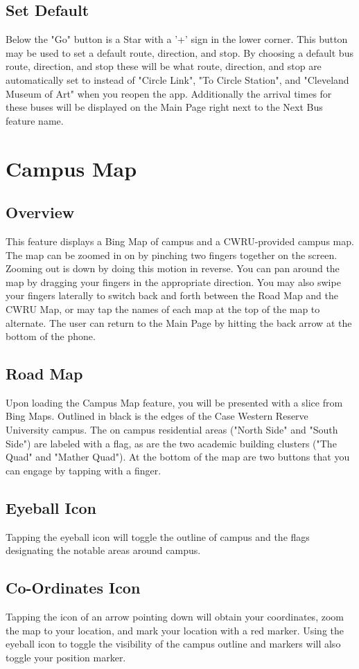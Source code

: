 \documentclass[pdftex,12pt,letter]{article}
\begin{document}
\subsection{Set Default}
Below the "Go" button is a Star with a '+' sign in the lower corner. This button may be used to set a default route, direction, and stop. By choosing a default bus route, direction, and stop these will be what route, direction, and stop are automatically set to instead of  "Circle Link", "To Circle Station", and "Cleveland Museum of Art" when you reopen the app. Additionally the arrival times for these buses will be displayed on the Main Page right next to the Next Bus feature name.

\section{Campus Map}
\subsection{Overview}
This feature displays a Bing Map of campus and a CWRU-provided campus map. The map can be zoomed in on by pinching two fingers together on the screen. Zooming out is down by doing this motion in reverse. You can pan around the map by dragging your fingers in the appropriate direction. You may also swipe your fingers laterally to switch back and forth between the Road Map and the CWRU Map, or may tap the names of each map at the top of the map to alternate. The user can return to the Main Page by hitting the back arrow at the bottom of the phone.
\subsection{Road Map}
Upon loading the Campus Map feature, you will be presented with a slice from Bing Maps. Outlined in black is the edges of the Case Western Reserve University campus. The on campus residential areas ("North Side" and "South Side") are labeled with a flag, as are the two academic building clusters ("The Quad" and "Mather Quad"). At the bottom of the map are two buttons that you can engage by tapping with a finger. 
\subsection{Eyeball Icon}
Tapping the eyeball icon will toggle the outline of campus and the flags designating the notable areas around campus. 
\subsection{Co-Ordinates Icon}
Tapping the icon of an arrow pointing down will obtain your coordinates, zoom the map to your location, and mark your location with a red marker. Using the eyeball icon to toggle the visibility of the campus outline and markers will also toggle your position marker.
\end{document}
